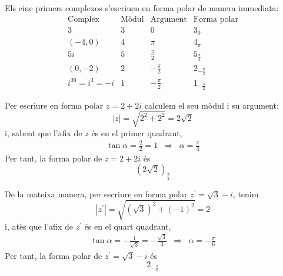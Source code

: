 \begin{solucio}
Els cinc primers complexos s’escriuen en forma polar de manera immediata:
\begin{equation*}
\begin{array}{cccc}
\text{Complex} & \text{Mòdul} & \text{Argument} & \text{Forma polar}
\\
3 & 3 & 0 & 3_{0} \\
(-4,0) & 4 & \pi & 4_{\pi } \\
5i & 5 & \frac{\pi }{2} & 5_{\frac{\pi }{2}} \\
(0,-2) & 2 & -\frac{\pi }{2} & 2_{-\frac{\pi }{2}} \\
i^{39}=i^{3}=-i & 1 & -\frac{\pi }{2} & 1_{-\frac{\pi }{2}}
\end{array}
\end{equation*}

Per escriure en forma polar $z=2+2i$ calculem el seu mòdul i su
argument:
\begin{equation*}
\left\vert z\right\vert =\sqrt{2^{2}+2^{2}}=2\sqrt{2}
\end{equation*}
i, sabent que l’afix de $z$ és en el primer quadrant,
\begin{equation*}
\begin{array}{lll}
\tan \alpha =\frac{2}{2}=1 & \Longrightarrow & \alpha =\frac{\pi }{4}
\end{array}
\end{equation*}
Per tant, la forma polar de $z=2+2i$ és
\begin{equation*}
\left( 2\sqrt{2}\right) _{\frac{\pi }{4}}
\end{equation*}

De la mateixa manera, per escriure en forma polar $z^{\prime }=\sqrt{3}-i$,
tenim
\begin{equation*}
\left\vert z^{\prime }\right\vert =\sqrt{\left( \sqrt{3}\right) ^{2}+(-1)^{2}
}=2
\end{equation*}
i, atès que l’afix de $z^{\prime }$ és en el quart quadrant,
\begin{equation*}
\begin{array}{lll}
\tan \alpha =-\frac{1}{\sqrt{3}}=-\frac{\sqrt{3}}{3} & \Longrightarrow &
\alpha =-\frac{\pi }{6}
\end{array}
\end{equation*}
Per tant, la forma polar de $z^{\prime }=\sqrt{3}-i$ és
\begin{equation*}
2_{-\frac{\pi }{6}}
\end{equation*}
\end{solucio}

